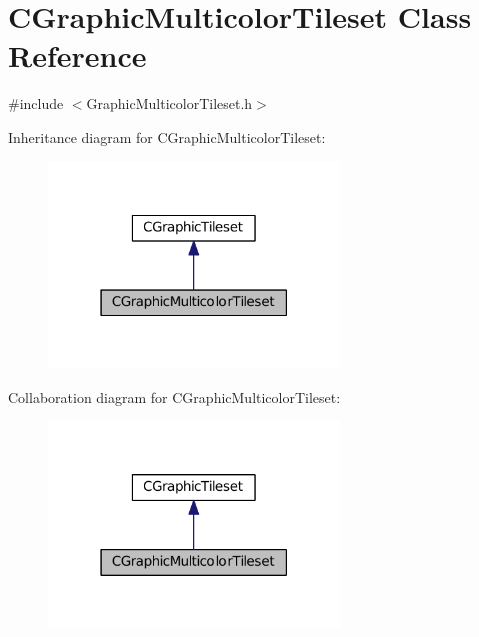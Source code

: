 \hypertarget{classCGraphicMulticolorTileset}{}\section{C\+Graphic\+Multicolor\+Tileset Class Reference}
\label{classCGraphicMulticolorTileset}


{\ttfamily \#include $<$Graphic\+Multicolor\+Tileset.\+h$>$}



Inheritance diagram for C\+Graphic\+Multicolor\+Tileset\+:\nopagebreak
\begin{figure}[H]
\begin{center}
\leavevmode
\includegraphics[width=219pt]{classCGraphicMulticolorTileset__inherit__graph}
\end{center}
\end{figure}


Collaboration diagram for C\+Graphic\+Multicolor\+Tileset\+:\nopagebreak
\begin{figure}[H]
\begin{center}
\leavevmode
\includegraphics[width=219pt]{classCGraphicMulticolorTileset__coll__graph}
\end{center}
\end{figure}
